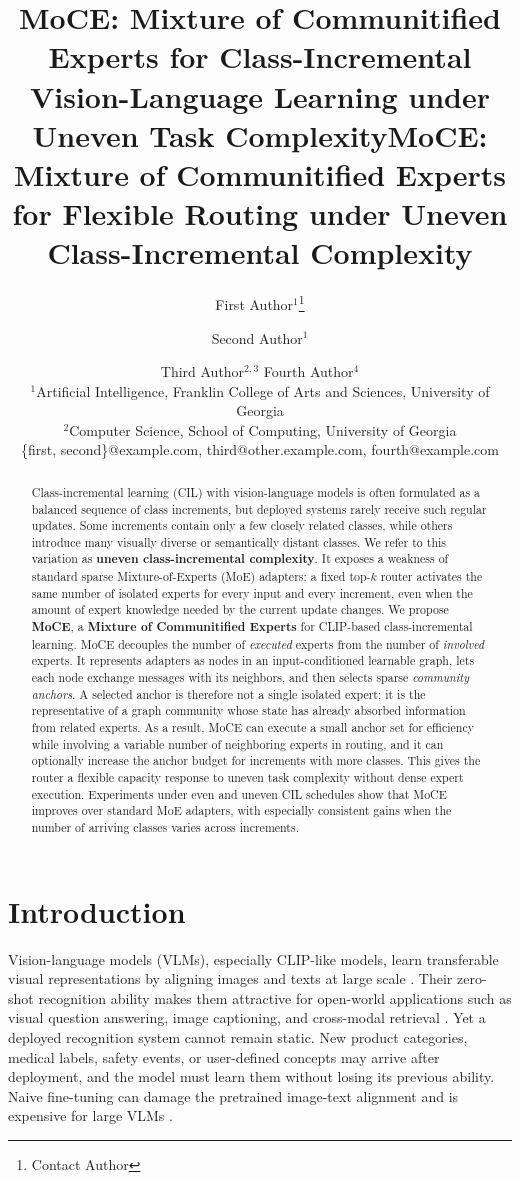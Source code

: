 \documentclass{article}
\title{MoCE: Mixture of Communitified Experts for Class-Incremental Vision-Language Learning under Uneven Task Complexity}
\title{MoCE: Mixture of Communitified Experts for Flexible Routing under Uneven Class-Incremental Complexity}
\author{
First Author$^1$\footnote{Contact Author}\and
Second Author$^1$\and
Third Author$^{2,3}$\And
Fourth Author$^4$\\
\affiliations
$^1$Artificial Intelligence, Franklin College of Arts and Sciences, University of Georgia\\
$^2$Computer Science, School of Computing, University of Georgia\\
\emails
\{first, second\}@example.com,
third@other.example.com,
fourth@example.com
}
\theoremstyle{definition}
\theoremstyle{remark}
\begin{document}
\maketitle

\begin{abstract}
Class-incremental learning (CIL) with vision-language models is often formulated as a balanced sequence of class increments, but deployed systems rarely receive such regular updates. Some increments contain only a few closely related classes, while others introduce many visually diverse or semantically distant classes. We refer to this variation as \textbf{uneven class-incremental complexity}. It exposes a weakness of standard sparse Mixture-of-Experts (MoE) adapters: a fixed top-$k$ router activates the same number of isolated experts for every input and every increment, even when the amount of expert knowledge needed by the current update changes. We propose \textbf{MoCE}, a \textbf{Mixture of Communitified Experts} for CLIP-based class-incremental learning. MoCE decouples the number of \textit{executed} experts from the number of \textit{involved} experts. It represents adapters as nodes in an input-conditioned learnable graph, lets each node exchange messages with its neighbors, and then selects sparse \textit{community anchors}. A selected anchor is therefore not a single isolated expert; it is the representative of a graph community whose state has already absorbed information from related experts. As a result, MoCE can execute a small anchor set for efficiency while involving a variable number of neighboring experts in routing, and it can optionally increase the anchor budget for increments with more classes. This gives the router a flexible capacity response to uneven task complexity without dense expert execution. Experiments under even and uneven CIL schedules show that MoCE improves over standard MoE adapters, with especially consistent gains when the number of arriving classes varies across increments.
\end{abstract}

\section{Introduction}
Vision-language models (VLMs), especially CLIP-like models, learn transferable visual representations by aligning images and texts at large scale \cite{radford2021learning,10.1109/TPAMI.2024.3369699}. Their zero-shot recognition ability makes them attractive for open-world applications such as visual question answering, image captioning, and cross-modal retrieval \cite{agrawal2016vqavisualquestionanswering,ye2024mplugowlmodularizationempowerslarge,penamakuri2023answerminingpoolimages}. Yet a deployed recognition system cannot remain static. New product categories, medical labels, safety events, or user-defined concepts may arrive after deployment, and the model must learn them without losing its previous ability. Naive fine-tuning can damage the pretrained image-text alignment and is expensive for large VLMs \cite{french1999catastrophic,DING2024120710,han2024parameterefficientfinetuninglargemodels}.
\end{document}
